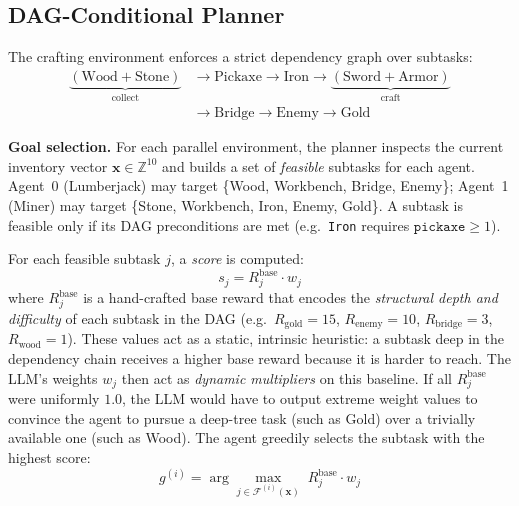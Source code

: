 \subsection{DAG-Conditional Planner}
\label{sec:dag_planner}

The crafting environment enforces a strict dependency graph over subtasks:
\begin{equation*}
\begin{aligned}
\underbrace{(\text{Wood} + \text{Stone})}_{\text{collect}} &\longrightarrow \text{Pickaxe} \longrightarrow \text{Iron} \longrightarrow \underbrace{(\text{Sword} + \text{Armor})}_{\text{craft}} \\
&\longrightarrow \text{Bridge} \longrightarrow \text{Enemy} \longrightarrow \text{Gold}
\end{aligned}
\end{equation*}

\noindent
\textbf{Goal selection.}
For each parallel environment, the planner inspects the current
inventory vector $\mathbf{x}\in\mathbb{Z}^{10}$ and builds a set of
\emph{feasible} subtasks for each agent.
Agent~0 (Lumberjack) may target \{Wood, Workbench, Bridge, Enemy\};
Agent~1 (Miner) may target \{Stone, Workbench, Iron, Enemy, Gold\}.
A subtask is feasible only if its DAG preconditions are met (e.g.\
\texttt{Iron} requires $\mathtt{pickaxe}\ge 1$).

For each feasible subtask $j$, a \emph{score} is computed:
\begin{equation}
\label{eq:greedy_score}
    s_j = R_j^{\text{base}} \cdot w_j
\end{equation}
where $R_j^{\text{base}}$ is a hand-crafted base reward that encodes the
\emph{structural depth and difficulty} of each subtask in the DAG
(e.g.\ $R_{\text{gold}}=15$, $R_{\text{enemy}}=10$,
$R_{\text{bridge}}=3$, $R_{\text{wood}}=1$).
These values act as a static, intrinsic heuristic: a subtask deep in the
dependency chain receives a higher base reward because it is harder to
reach.
The LLM's weights $w_j$ then act as \emph{dynamic multipliers} on this
baseline.
If all $R_j^{\text{base}}$ were uniformly $1.0$, the LLM would have to
output extreme weight values to convince the agent to pursue a deep-tree
task (such as Gold) over a trivially available one (such as Wood).
The agent greedily selects the subtask with the highest score:
\begin{equation}
\label{eq:greedy_select}
    g^{(i)} = \arg\max_{j \in \mathcal{F}^{(i)}(\mathbf{x})}\;
              R_j^{\text{base}} \cdot w_j
\end{equation}

